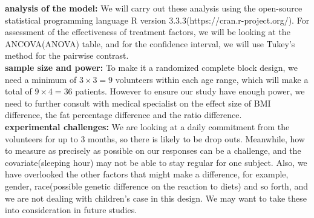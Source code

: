 \documentclass[11pt]{article}  %
\begin{document}
\textbf{analysis of the model: }We will carry out these analysis using the open-source statistical programming language R version 3.3.3(https://cran.r-project.org/). For assessment of the effectiveness of treatment factors, we will be looking at the ANCOVA(ANOVA) table, and for the confidence interval, we will use Tukey's method for the pairwise contrast.\\
\textbf{sample size and power: }To make it a randomized complete block design, we need a minimum of $3 \times 3 = 9$ volunteers within each age range, which will make a total of $9 \times 4 = 36$ patients. However to ensure our study have enough power, we need to further consult with medical specialist on the effect size of BMI difference, the fat percentage difference and the ratio difference.\\
\textbf{experimental challenges: }We are looking at a daily commitment from the volunteers for up to 3 months, so there is likely to be drop outs. Meanwhile, how to measure as precisely as possible on our responses can be a challenge, and the covariate(sleeping hour) may not be able to stay regular for one subject. Also, we have overlooked the other factors that might make a difference, for example, gender, race(possible genetic difference on the reaction to diets) and so forth, and we are not dealing with children's case in this design. We may want to take these into consideration in future studies.
\end{document}
